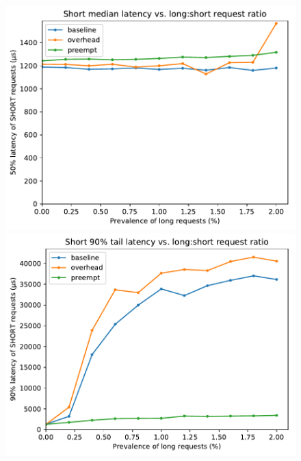 \begin{figure}
	\begin{minipage}{\columnwidth}
	\includegraphics[width=\textwidth]{figs/twooom_50-short}
	\end{minipage}
%
	\begin{minipage}{\columnwidth}
	\includegraphics[width=\textwidth]{figs/twooom_90-short}
	\end{minipage}


\end{figure}
